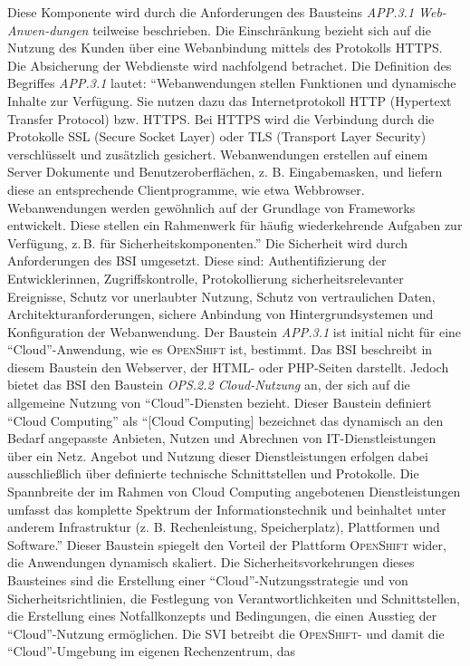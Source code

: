 Diese Komponente wird durch die Anforderungen des Bausteins \textit{APP.3.1 Web-Anwen-dungen} teilweise beschrieben. Die Einschränkung bezieht sich auf die Nutzung des Kunden über eine Webanbindung mittels des Protokolls \ac{HTTPS}. Die Absicherung der Webdienste wird nachfolgend betrachet. Die Definition des Begriffes \textit{APP.3.1} lautet: \enquote{Webanwendungen stellen Funktionen und dynamische Inhalte zur Verfügung. Sie nutzen dazu das Internetprotokoll HTTP (Hypertext Transfer Protocol) bzw. HTTPS. Bei HTTPS wird die Verbindung durch die Protokolle SSL (Secure Socket Layer) oder TLS (Transport Layer Security) verschlüsselt und zusätzlich gesichert. Webanwendungen erstellen auf einem Server Dokumente und Benutzeroberflächen, z. B. Eingabemasken, und liefern diese an entsprechende Clientprogramme, wie etwa Webbrowser. Webanwendungen werden gewöhnlich auf der Grundlage von Frameworks entwickelt. Diese stellen ein Rahmenwerk für häufig wiederkehrende Aufgaben zur Verfügung, z.\,B. für Sicherheitskomponenten.}\autocite[][S.\,383]{bundesamt_fur_sicherheit_in_der_informationstechnik_bsi_it-grundschutz-kompendium_2020} Die Sicherheit wird durch Anforderungen des \ac{BSI} umgesetzt. Diese sind: Authentifizierung der Entwicklerinnen, Zugriffskontrolle, Protokollierung sicherheitsrelevanter Ereignisse, Schutz vor unerlaubter Nutzung, Schutz von vertraulichen Daten, Architekturanforderungen, sichere Anbindung von Hintergrundsystemen und Konfiguration der Webanwendung.\autocite[vgl.][S.\,385-389]{bundesamt_fur_sicherheit_in_der_informationstechnik_bsi_it-grundschutz-kompendium_2020} Der Baustein \textit{APP.3.1} ist initial nicht für eine \enquote{Cloud}-Anwendung, wie es \textsc{OpenShift} ist, bestimmt. Das \ac{BSI} beschreibt in diesem Baustein den Webserver, der \textsc{HTML}- oder \textsc{PHP}-Seiten darstellt. Jedoch bietet das \ac{BSI} den Baustein \textit{OPS.2.2 Cloud-Nutzung} an, der sich auf die allgemeine Nutzung von \enquote{Cloud}-Diensten bezieht. Dieser Baustein definiert \enquote{Cloud Computing} als \enquote{[Cloud Computing] bezeichnet das dynamisch an den Bedarf angepasste Anbieten, Nutzen und Abrechnen von IT-Dienstleistungen über ein Netz. Angebot und Nutzung dieser Dienstleistungen erfolgen dabei ausschließlich über definierte technische Schnittstellen und Protokolle. Die Spannbreite der im Rahmen von Cloud Computing angebotenen Dienstleistungen umfasst das komplette Spektrum der Informationstechnik und beinhaltet unter anderem Infrastruktur (z. B. Rechenleistung, Speicherplatz), Plattformen und Software.}\autocite[][S.\,265]{bundesamt_fur_sicherheit_in_der_informationstechnik_bsi_it-grundschutz-kompendium_2020} Dieser Baustein spiegelt den Vorteil der Plattform \textsc{OpenShift} wider, die Anwendungen dynamisch skaliert. Die Sicherheitsvorkehrungen dieses Bausteines sind die Erstellung einer \enquote{Cloud}-Nutzungsstrategie und von Sicherheitsrichtlinien, die Festlegung von Verantwortlichkeiten und Schnittstellen, die Erstellung eines Notfallkonzepts und Bedingungen, die einen Ausstieg der \enquote{Cloud}-Nutzung ermöglichen.\autocite[vgl.][S.\,268-271]{bundesamt_fur_sicherheit_in_der_informationstechnik_bsi_it-grundschutz-kompendium_2020} Die \ac{SVI} betreibt die \textsc{OpenShift}- und damit die \enquote{Cloud}-Umgebung im  eigenen Rechenzentrum, das 